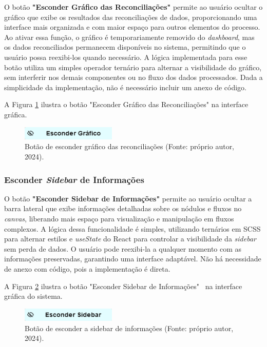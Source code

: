 O botão \textbf{"Esconder Gráfico das Reconciliações"} permite ao usuário ocultar o gráfico que exibe os resultados das reconciliações de dados, proporcionando uma interface mais organizada e com maior espaço para outros elementos do processo. Ao ativar essa função, o gráfico é temporariamente removido do \textit{dashboard}, mas os dados reconciliados permanecem disponíveis no sistema, permitindo que o usuário possa reexibi-los quando necessário. A lógica implementada para esse botão utiliza um simples operador ternário para alternar a visibilidade do gráfico, sem interferir nos demais componentes ou no fluxo dos dados processados. Dada a simplicidade da implementação, não é necessário incluir um anexo de código.

A Figura \ref{Fig:Recon} ilustra o botão "Esconder Gráfico das Reconciliações" na interface gráfica.

\begin{figure}[htbp] \centering \includegraphics[width=0.4\textwidth]{figuras/hide-graphbar-button.png} \caption{Botão de esconder gráfico das reconciliações (Fonte: próprio autor, 2024).} \label{Fig:Recon} \end{figure}

\subsubsection{Esconder \textit{Sidebar} de Informações}

O botão \textbf{"Esconder Sidebar de Informações"} permite ao usuário ocultar a barra lateral que exibe informações detalhadas sobre os nódulos e fluxos no \textit{canvas}, liberando mais espaço para visualização e manipulação em fluxos complexos. A lógica dessa funcionalidade é simples, utilizando ternários em SCSS para alternar estilos e \textit{useState} do React para controlar a visibilidade da \textit{sidebar} sem perda de dados. O usuário pode reexibi-la a qualquer momento com as informações preservadas, garantindo uma interface adaptável. Não há necessidade de anexo com código, pois a implementação é direta.

A Figura \ref{Fig:HideSidebarButton} ilustra o botão "Esconder Sidebar de Informações" \ na interface gráfica do sistema.

\begin{figure}[htbp]
    \centering
    \includegraphics[width=0.4\textwidth]{figuras/hide-sidebar-button.png}
    \caption{Botão de esconder a sidebar de informações (Fonte: próprio autor, 2024).}
    \label{Fig:HideSidebarButton}
\end{figure}

